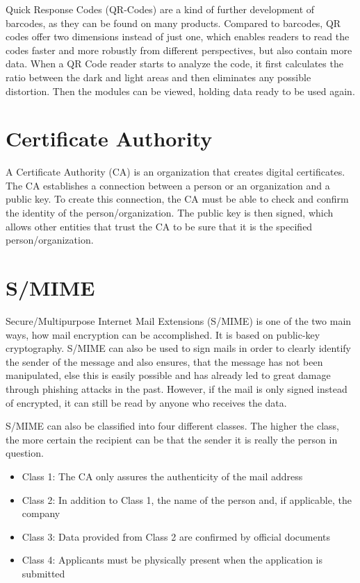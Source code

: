 \documentclass[12pt,oneside,a4paper,parskip]{scrbook}
\begin{document}
Quick Response Codes (QR-Codes) are a kind of further development of barcodes, as they can be found on many products. Compared to barcodes, QR codes offer two dimensions instead of just one, which enables readers to read the codes faster and more robustly from different perspectives, but also contain more data. When a QR Code reader starts to analyze the code, it first calculates the ratio between the dark and light areas and then eliminates any possible distortion. Then the modules can be viewed, holding data ready to be used again. \parencite{qr_codes}

\section{Certificate Authority}
\label{sec:CA}

A Certificate Authority (CA) is an organization that creates digital certificates. The CA establishes a connection between a person or an organization and a public key. To create this connection, the CA must be able to check and confirm the identity of the person/organization. The public key is then signed, which allows other entities that trust the CA to be sure that it is the specified person/organization.
\parencite{luber_ca_2018}


\section{S/MIME}
Secure/Multipurpose Internet Mail Extensions (S/MIME) is one of the two main ways, how mail encryption can be accomplished. It is based on public-key cryptography. S/MIME can also be used to sign mails in order to clearly identify the sender of the message and also ensures, that the message has not been manipulated, 
else this is easily possible and has already led to great damage through phishing attacks in the past. 
However, if the mail is only signed instead of encrypted, it can still be read by anyone who receives the data. \parencite{villadiego_dangers_2017}

S/MIME can also be classified into four different classes. The higher the class, the more certain the recipient can be that the sender it is really the person in question.
\begin{itemize}
    \item Class 1: The CA only assures the authenticity of the mail address
    \item Class 2: In addition to Class 1, the name of the person and, if applicable, the company
    \item Class 3: Data provided from Class 2 are confirmed by official documents
    \item Class 4: Applicants must be physically present when the application is submitted
\end{itemize}
\end{document}

